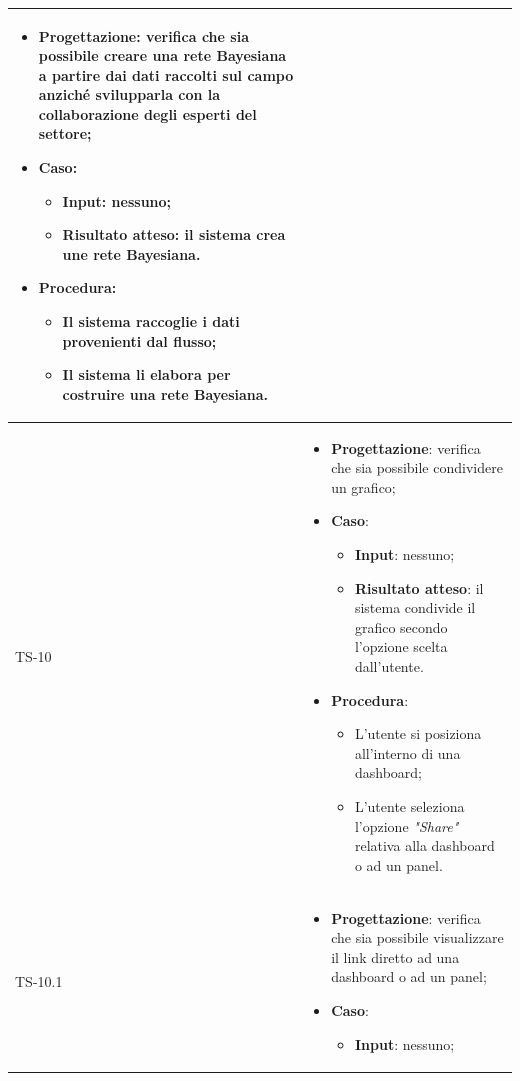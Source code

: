 \begin{longtable}{|C{2.5cm}|C{13cm}|}
\begin{itemize}
	\item \textbf{Progettazione}: verifica che sia  possibile creare una rete
	Bayesiana a partire dai dati raccolti sul campo anziché svilupparla con la
	collaborazione degli esperti del settore;
	\item \textbf{Caso}: 
	\begin{itemize}
		\item \textbf{Input}: nessuno;
		\item \textbf{Risultato atteso}: il sistema crea une rete Bayesiana.
	\end{itemize}
	\item \textbf{Procedura}:
	\begin{itemize}
		\item Il sistema raccoglie i dati provenienti dal flusso;
		\item Il sistema li elabora per costruire una rete Bayesiana.
	\end{itemize} 
\end{itemize} \\
\hline
	{TS-10} &
\begin{itemize}
	\item \textbf{Progettazione}: verifica che sia possibile condividere un
	grafico;
	\item \textbf{Caso}: 
	\begin{itemize}
		\item \textbf{Input}: nessuno;
		\item \textbf{Risultato atteso}: il sistema condivide il grafico secondo l'opzione scelta dall'utente.
	\end{itemize}
	\item \textbf{Procedura}:
	\begin{itemize}
		\item L'utente si posiziona all'interno di una dashboard;
		\item L'utente seleziona l'opzione \emph{"Share"} relativa alla dashboard o ad un panel.
	\end{itemize} 
\end{itemize}
	  \\
	\hline
	{TS-10.1} & 
\begin{itemize}
	\item \textbf{Progettazione}: verifica che sia possibile visualizzare il
	link diretto ad una dashboard o ad un panel;
	\item \textbf{Caso}: 
	\begin{itemize}
		\item \textbf{Input}: nessuno;

\end{itemize}
\end{itemize}
\end{longtable}
